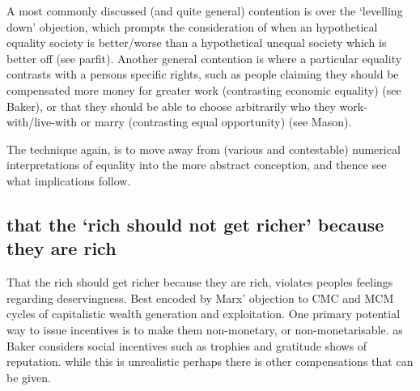 A most commonly discussed (and quite general) contention is over the `levelling down' objection, which prompts the consideration of when an hypothetical equality society is better/worse than a hypothetical unequal society which is better off (see parfit). Another general contention is where a particular equality contrasts with a persons specific rights, such as people claiming they should be compensated more money for greater work (contrasting economic equality) (see Baker), or that they should be able to choose arbitrarily who they work-with/live-with or marry (contrasting equal opportunity) (see Mason).


The technique again, is to move away from (various and contestable) numerical interpretations of equality into the more abstract conception, and thence see what implications follow.






\subsection{that the `rich should not get richer' because they are rich}

That the rich should get richer because they are rich, violates peoples feelings regarding deservingness.
Best encoded by Marx' objection to CMC and MCM cycles of capitalistic wealth generation and exploitation.
One primary potential way to issue incentives is to make them non-monetary, or non-monetarisable. as Baker considers social incentives such as trophies and gratitude shows of reputation. while this is unrealistic perhaps there is other compensations that can be given.

